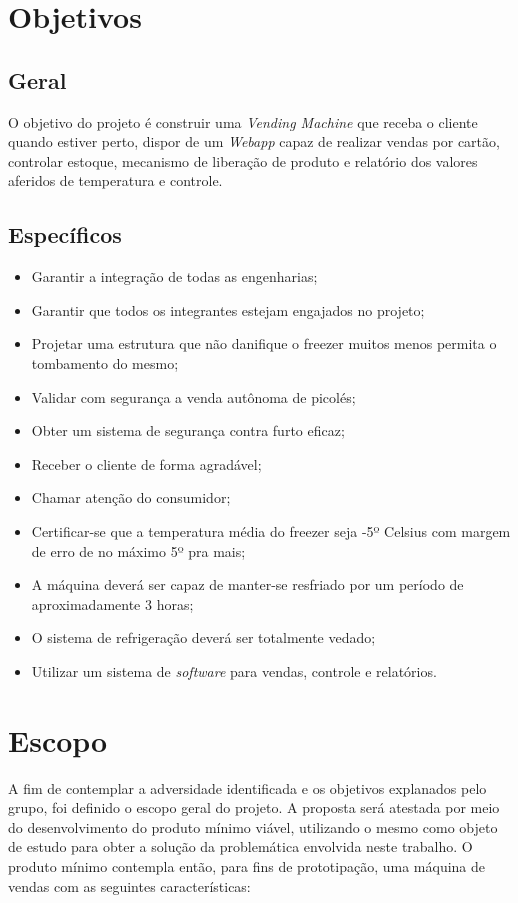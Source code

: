 \section{Objetivos}

\subsection{Geral}

O objetivo do projeto é construir uma \textit{Vending Machine} que receba o cliente quando estiver perto, dispor de um \textit{Webapp} capaz de realizar vendas por cartão, controlar estoque, mecanismo de liberação de produto e relatório dos valores aferidos de temperatura e controle.  

\subsection{Específicos}

\begin{itemize}
\item Garantir a integração de todas as engenharias;
\item Garantir que todos os integrantes estejam engajados no projeto;
\item Projetar uma estrutura que não danifique o freezer muitos menos permita o tombamento do mesmo;
\item Validar com segurança a venda autônoma de picolés;
\item Obter um sistema de segurança contra furto eficaz;
\item Receber o cliente de forma agradável;
\item Chamar atenção do consumidor;
\item Certificar-se que a temperatura média do freezer seja -5º Celsius com margem de erro de no máximo 5º pra mais;
\item A máquina deverá ser capaz de manter-se resfriado por um período de aproximadamente 3 horas;
\item O sistema de refrigeração deverá ser totalmente vedado;
\item Utilizar um sistema de \textit{software} para vendas, controle e relatórios.
\end{itemize}


\section{Escopo}
A fim de contemplar a adversidade identificada e os objetivos explanados pelo grupo, foi definido o escopo geral do projeto. A proposta será atestada por meio do desenvolvimento do produto mínimo viável, utilizando o mesmo como objeto de estudo para obter a solução da problemática envolvida neste trabalho. O produto mínimo contempla então, para fins de prototipação, uma máquina de vendas com as seguintes características:

